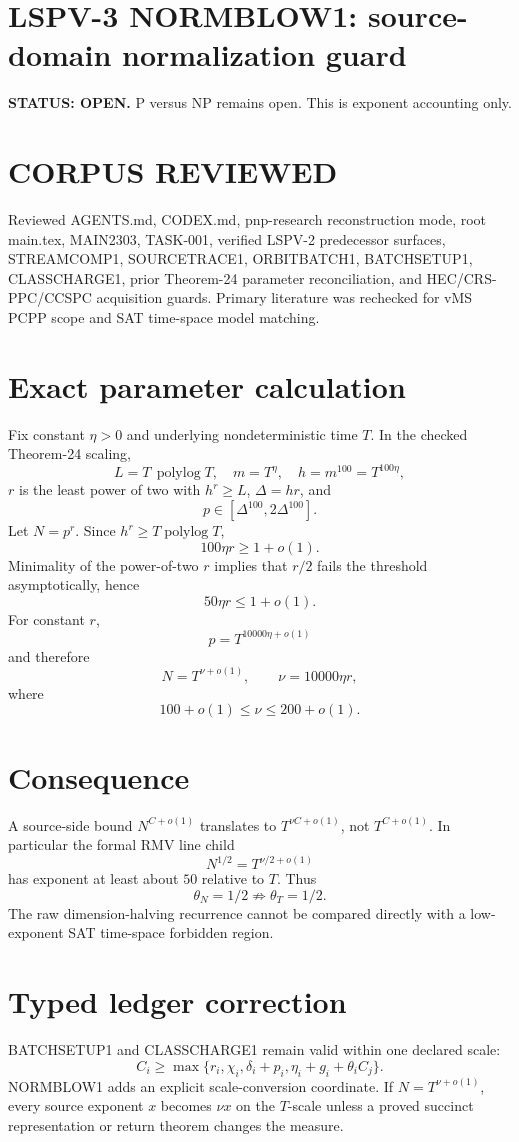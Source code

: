 \documentclass[11pt]{article}
\begin{document}
\section*{LSPV-3 NORMBLOW1: source-domain normalization guard}
\textbf{STATUS: OPEN.} P versus NP remains open. This is exponent accounting only.

\section*{CORPUS REVIEWED}
Reviewed AGENTS.md, CODEX.md, pnp-research reconstruction mode, root main.tex, MAIN2303, TASK-001, verified LSPV-2 predecessor surfaces, STREAMCOMP1, SOURCETRACE1, ORBITBATCH1, BATCHSETUP1, CLASSCHARGE1, prior Theorem-24 parameter reconciliation, and HEC/CRS-PPC/CCSPC acquisition guards. Primary literature was rechecked for vMS PCPP scope and SAT time-space model matching.

\section*{Exact parameter calculation}
Fix constant \(\eta>0\) and underlying nondeterministic time \(T\). In the checked Theorem-24 scaling,
\[
L=T\,\operatorname{polylog}T,\quad m=T^\eta,\quad h=m^{100}=T^{100\eta},
\]
\(r\) is the least power of two with \(h^r\ge L\), \(\Delta=hr\), and
\[
p\in[\Delta^{100},2\Delta^{100}].
\]
Let \(N=p^r\). Since \(h^r\ge T\operatorname{polylog}T\),
\[
100\eta r\ge1+o(1).
\]
Minimality of the power-of-two \(r\) implies that \(r/2\) fails the threshold asymptotically, hence
\[
50\eta r\le1+o(1).
\]
For constant \(r\),
\[
p=T^{10000\eta+o(1)}
\]
and therefore
\[
\boxed{N=T^{\nu+o(1)},\qquad \nu=10000\eta r,}
\]
where
\[
\boxed{100+o(1)\le\nu\le200+o(1).}
\]

\section*{Consequence}
A source-side bound \(N^{C+o(1)}\) translates to \(T^{\nu C+o(1)}\), not \(T^{C+o(1)}\). In particular the formal RMV line child
\[
N^{1/2}=T^{\nu/2+o(1)}
\]
has exponent at least about \(50\) relative to \(T\). Thus
\[
\boxed{\theta_N=1/2\not\Rightarrow\theta_T=1/2.}
\]
The raw dimension-halving recurrence cannot be compared directly with a low-exponent SAT time-space forbidden region.

\section*{Typed ledger correction}
BATCHSETUP1 and CLASSCHARGE1 remain valid within one declared scale:
\[
C_i\ge\max\{r_i,\chi_i,\delta_i+p_i,\eta_i+g_i+\theta_iC_j\}.
\]
NORMBLOW1 adds an explicit scale-conversion coordinate. If \(N=T^{\nu+o(1)}\), every source exponent \(x\) becomes \(\nu x\) on the \(T\)-scale unless a proved succinct representation or return theorem changes the measure.
\end{document}

